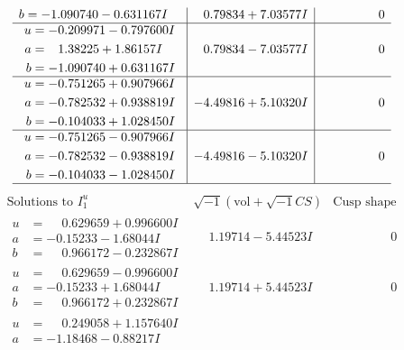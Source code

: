 \documentclass[1p]{elsarticle_modified}
\theoremstyle{definition}
\newcommand{\I}{\sqrt{-1}}
\begin{document}
$$\begin{array}{c|c|c}
\begin{aligned}
b &= -1.090740 - 0.631167 I\end{aligned}
 & \phantom{-}0.79834 + 7.03577 I & \phantom{-0.000000 } 0 \\ \hline\begin{aligned}
u &= -0.209971 - 0.797600 I \\
a &= \phantom{-}1.38225 + 1.86157 I \\
b &= -1.090740 + 0.631167 I\end{aligned}
 & \phantom{-}0.79834 - 7.03577 I & \phantom{-0.000000 } 0 \\ \hline\begin{aligned}
u &= -0.751265 + 0.907966 I \\
a &= -0.782532 + 0.938819 I \\
b &= -0.104033 + 1.028450 I\end{aligned}
 & -4.49816 + 5.10320 I & \phantom{-0.000000 } 0 \\ \hline\begin{aligned}
u &= -0.751265 - 0.907966 I \\
a &= -0.782532 - 0.938819 I \\
b &= -0.104033 - 1.028450 I\end{aligned}
 & -4.49816 - 5.10320 I & \phantom{-0.000000 } 0\\
 \hline 
 \end{array}$$\newpage$$\begin{array}{c|c|c}  
\text{Solutions to }I^u_{1}& \I (\text{vol} + \sqrt{-1}CS) & \text{Cusp shape}\\
 \hline 
\begin{aligned}
u &= \phantom{-}0.629659 + 0.996600 I \\
a &= -0.15233 - 1.68044 I \\
b &= \phantom{-}0.966172 - 0.232867 I\end{aligned}
 & \phantom{-}1.19714 - 5.44523 I & \phantom{-0.000000 } 0 \\ \hline\begin{aligned}
u &= \phantom{-}0.629659 - 0.996600 I \\
a &= -0.15233 + 1.68044 I \\
b &= \phantom{-}0.966172 + 0.232867 I\end{aligned}
 & \phantom{-}1.19714 + 5.44523 I & \phantom{-0.000000 } 0 \\ \hline\begin{aligned}
u &= \phantom{-}0.249058 + 1.157640 I \\
a &= -1.18468 - 0.88217 I \\

\end{aligned}
\end{array}$$
\end{document}
